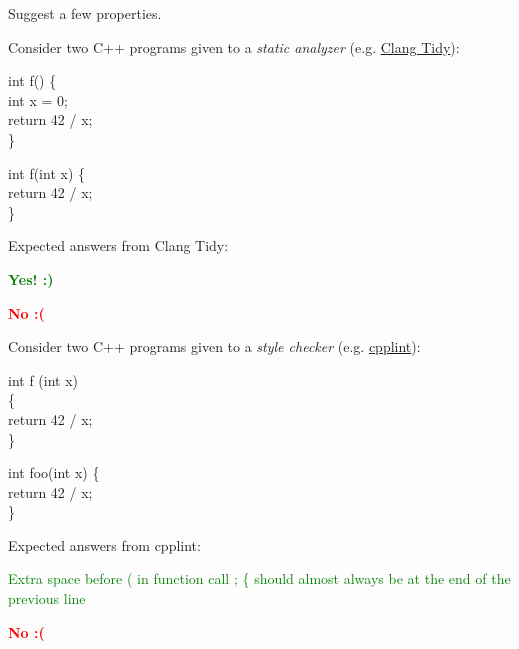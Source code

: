 \documentclass{article}
\begin{document}
Suggest a few properties.

\plush{}


Consider two C++ programs given to a \emph{static analyzer} (e.g. \href{https://clang.llvm.org/extra/clang-tidy/}{Clang Tidy}):

\begin{multicols}{2}
{\ttfamily
int f() \{ \\
\quad int x = 0; \\
\quad return 42 / x; \\
\}}
\par\columnbreak\par
{\ttfamily
int f(int x) \{ \\
\quad return 42 / x; \\
\}}
\end{multicols}

Expected answers from Clang Tidy:

\begin{multicols}{2}
\textcolor{green}{\textbf{Yes! :)}}
\par\columnbreak\par
\textcolor{red}{\textbf{No :(}}
\end{multicols}

\plush{}


Consider two C++ programs given to a \emph{style checker} (e.g. \href{https://github.com/cpplint/cpplint}{cpplint}):

\begin{multicols}{2}
{\ttfamily
int f (int x) \\
\{ \\
\quad return 42 / x; \\
\}}
\par\columnbreak\par
{\ttfamily
int foo(int x) \{ \\
\quad return 42 / x; \\
\}}
\end{multicols}

Expected answers from cpplint:

\begin{multicols}{2}
\textcolor{green}{{\ttfamily Extra space before ( in function call ; \{ should almost always be at the end of the previous line}}
\par\columnbreak\par
\textcolor{red}{\textbf{No :(}}
\end{multicols}
\end{document}

